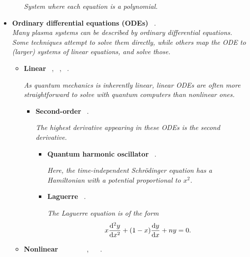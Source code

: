 \documentclass[12pt,letterpaper]{article}
\begin{document}
\begin{itemize}
\begin{itemize}
            \emph{System where each equation is a polynomial.}
		\end{itemize}
  
	\item \textbf{Ordinary differential equations (ODEs)}  ~\cite{zangerQuantumAlgorithmsSolving2021}.
    \\\emph{Many plasma systems can be described by ordinary differential equations. Some techniques attempt to solve them directly, while others map the ODE to (larger) systems of linear equations, and solve those.}
		\begin{itemize} 
			\item \textbf{Linear}  ~\cite{berryHighorderQuantumAlgorithm2014,berryQuantumAlgorithmLinear2017,childsQuantumSpectralMethods2020,fangTimemarchingBasedQuantum2022,jinQuantumSimulationPartial2022}, ~\cite{jinQuantumSimulationPartial2022a},  ~\cite{zangerQuantumAlgorithmsSolving2021}.

            \textit{As quantum mechanics is inherently linear, linear ODEs are often more straightforward to solve with quantum computers than nonlinear ones.}
            
				\begin{itemize} 
					\item \textbf{Second-order}  ~\cite{srivastavaBoxAlgorithmSolution2019}.

                    \textit{The highest derivative appearing in these ODEs is the second derivative.}
                    
                    \begin{itemize} 
                        \item \textbf{Quantum harmonic oscillator}  ~\cite{ricardoAlternativesNonhomogeneousPartial2022}.

                        \textit{Here, the time-independent Schrödinger equation has a Hamiltonian with a potential proportional to $x^2$.}

                        \item \textbf{Laguerre}  ~\cite{criadoQadeSolvingDifferential2022}.

                        \textit{The Laguerre equation is of the form $$x\dv[2]{y}{x}+(1-x)\dv{y}{x} + ny=0.$$}
                    \end{itemize}
				\end{itemize}
			\item \textbf{Nonlinear} ~ ~\cite{kyriienkoSolvingNonlinearDifferential2021, shiSimulatingNonnativeCubic2021} ~ ~\cite{leytonQuantumAlgorithmSolve2008,dodinQuantumComputationNonlinear2021,lloydQuantumAlgorithmNonlinear2020} ~\cite{jinQuantumSimulationPartial2022a,liuEfficientQuantumAlgorithm2021,suranaCarlemanLinearizationBased2022b}, ~ ~\cite{zangerQuantumAlgorithmsSolving2021}.


\end{itemize}
\end{itemize}
\end{document}
